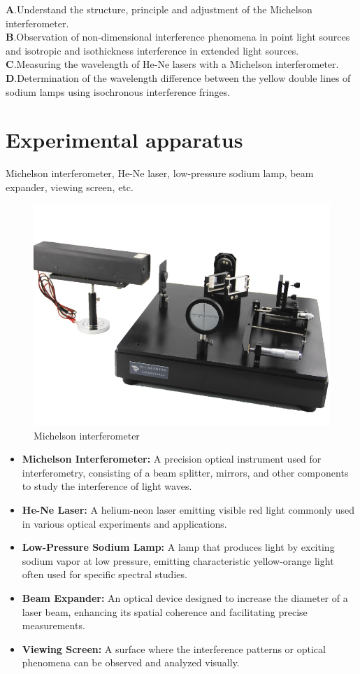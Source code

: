 \documentclass[UTF8]{article}
\begin{document}
   $\bm{A}$.Understand the structure, principle and adjustment of the Michelson interferometer.\\
   $\bm{B}$.Observation of non-dimensional interference phenomena in point light sources and isotropic and isothickness interference in extended light sources.\\
   $\bm{C}$.Measuring the wavelength of He-Ne lasers with a Michelson interferometer.\\
   $\bm{D}$.Determination of the wavelength difference between the yellow double lines of sodium lamps using isochronous interference fringes.


	\section{Experimental apparatus}
	Michelson interferometer, He-Ne laser, low-pressure sodium lamp, beam expander, viewing screen, etc.

\begin{figure}[h]
    \centering
    \includegraphics[width=0.5\linewidth]{FIG2.png}
    \caption{Michelson interferometer}
    \label{fig:Michelson interferometer}
\end{figure}

\begin{itemize}
    \item \textbf{Michelson Interferometer:} A precision optical instrument used for interferometry, consisting of a beam splitter, mirrors, and other components to study the interference of light waves.
    
    \item \textbf{He-Ne Laser:} A helium-neon laser emitting visible red light commonly used in various optical experiments and applications.

    \item \textbf{Low-Pressure Sodium Lamp:} A lamp that produces light by exciting sodium vapor at low pressure, emitting characteristic yellow-orange light often used for specific spectral studies.

    \item \textbf{Beam Expander:} An optical device designed to increase the diameter of a laser beam, enhancing its spatial coherence and facilitating precise measurements.

    \item \textbf{Viewing Screen:} A surface where the interference patterns or optical phenomena can be observed and analyzed visually.

    
\end{itemize}
\end{document}
